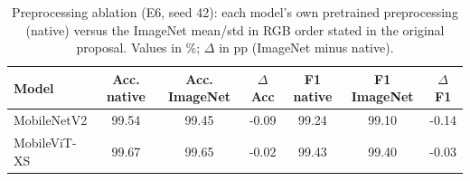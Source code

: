 \begin{table}[!t]
\centering
\footnotesize
\caption{Preprocessing ablation (E6, seed 42): each model's own pretrained preprocessing (native) versus the ImageNet mean/std in RGB order stated in the original proposal. Values in \%; $\Delta$ in pp (ImageNet minus native).}
\label{tab:ablation}
\begin{tabular}{lcccccc}
\toprule
Model & Acc. native & Acc. ImageNet & $\Delta$Acc & F1 native & F1 ImageNet & $\Delta$F1 \\
\midrule
MobileNetV2 & 99.54 & 99.45 & -0.09 & 99.24 & 99.10 & -0.14 \\
MobileViT-XS & 99.67 & 99.65 & -0.02 & 99.43 & 99.40 & -0.03 \\
\bottomrule
\end{tabular}
\end{table}

